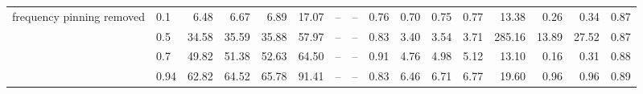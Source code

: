 \begin{table}
{\begin{tabular}{llrrrrrrrrrrrrrr}
\cmidrule{1-16}
\multirow[t]{4}{*}{frequency pinning removed} & 0.1 & 6.48 & 6.67 & 6.89 & 17.07 & -- & -- & 0.76 & 0.70 & 0.75 & 0.77 & 13.38 & 0.26 & 0.34 & 0.87 \\
 & 0.5 & 34.58 & 35.59 & 35.88 & 57.97 & -- & -- & 0.83 & 3.40 & 3.54 & 3.71 & 285.16 & 13.89 & 27.52 & 0.87 \\
 & 0.7 & 49.82 & 51.38 & 52.63 & 64.50 & -- & -- & 0.91 & 4.76 & 4.98 & 5.12 & 13.10 & 0.16 & 0.31 & 0.88 \\
 & 0.94 & 62.82 & 64.52 & 65.78 & 91.41 & -- & -- & 0.83 & 6.46 & 6.71 & 6.77 & 19.60 & 0.96 & 0.96 & 0.89 \\
\cmidrule{1-16}
\bottomrule
\end{tabular}%
}
\end{table}
